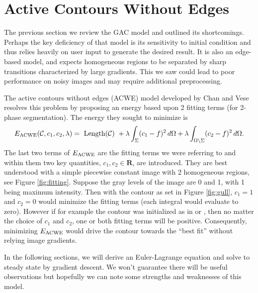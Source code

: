 \chapter{Active Contours Without Edges}
The previous section we review the GAC model and outlined its shortcomings. Perhaps the key deficiency of that model is its sensitivity to initial condition and thus relies heavily on user input to generate the desired result. It is also an edge-based model, and expects homogeneous regions to be separated by sharp transitions characterized by large gradients. This we saw could lead to poor performance on noisy images and may require additional preprocessing.

The active contours without edges (ACWE) model developed by Chan and Vese \cite{chan2001active} resolves this problem by proposing an energy based upon 2 fitting terms (for 2-phase segmentation). The energy they sought to minimize is 
\begin{align}
E_\textrm{ACWE}(\mathcal{C}, c_1, c_2, \lambda)
= \textrm{ Length($\mathcal{C}$) } 
+ \lambda \int_{\Sigma} (c_1 - f )^2 \,d\Omega
+ \lambda \int_{\Omega \setminus \Sigma} (c_2 - f )^2 \,d\Omega.
\end{align}
The last two terms of $E_\textrm{ACWE}$ are the fitting terms we were referring to and within them two key quantities, $c_1, c_2 \in \mathbf{R}$, are introduced. They are best understood with a simple piecewise constant image with 2 homogeneous regions, see Figure \ref{fig:fitting}. Suppose the gray levels of the image are 0 and 1, with 1 being maximum intensity. Then with the contour as set in Figure \ref{fig:gull}, $c_1 = 1$ and $c_2 = 0$ would minimize the fitting terms (each integral would evaluate to zero). However if for example the contour was initialized as in  or , then no matter the choice of $c_1$ and $c_2$, one or both fitting terms will be positive. Consequently, minimizing $E_\textrm{ACWE}$ would drive the contour towards the ``best fit'' without relying image gradients.

In the following sections, we will derive an Euler-Lagrange equation and solve to steady state by gradient descent. We won't guarantee there will be useful observations but hopefully we can note some strengths and weaknesses of this model.

